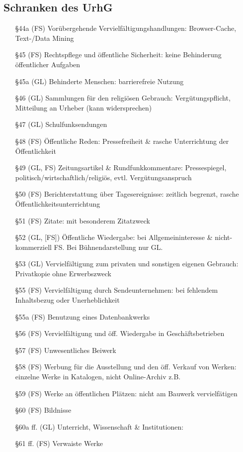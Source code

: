 \documentclass{article}
\begin{document}
\subsection{Schranken des UrhG}
\begin{itemize}
  \item[§44a] (FS) Vorübergehende Vervielfältigungshandlungen: Browser-Cache, Text-/Data Mining
  \item[§45] (FS) Rechtspflege und öffentliche Sicherheit: keine Behinderung öffentlicher Aufgaben
  \item[§45a] (GL) Behinderte Menschen: barrierefreie Nutzung
  \item[§46] (GL)  Sammlungen für den religiösen Gebrauch: Vergütungspflicht, Mitteilung an Urheber (kann widersprechen)
  \item[§47] (GL)  Schulfunksendungen
  \item[§48] (FS)  Öffentliche Reden: Pressefreiheit \& rasche Unterrichtung der Öffentlichkeit
  \item[§49] (GL, FS) Zeitungsartikel \& Rundfunkkommentare: Pressespiegel, politisch/wirtschaftlich/religiös, evtl. Vergütungsanspruch
  \item[§50] (FS) Berichterstattung über Tagesereignisse: zeitlich begrenzt, rasche Öffentlichkeitsunterrichtung
  \item[§51] (FS) Zitate: mit besonderem Zitatzweck
  \item[§52] (GL, [FS]) Öffentliche Wiedergabe: bei Allgemeininteresse \& nicht-kommerziell FS. Bei Bühnendarstellung nur GL.
  \item[§53] (GL) Vervielfältigung zum privaten und sonstigen eigenen Gebrauch: Privatkopie ohne Erwerbszweck
  \item[§55] (FS) Vervielfältigung durch Sendeunternehmen: bei fehlendem Inhaltsbezug oder Unerheblichkeit
  \item[§55a] (FS) Benutzung eines Datenbankwerks
  \item[§56] (FS) Vervielfältigung und öff. Wiedergabe in Geschäftsbetrieben
  \item[§57] (FS) Unwesentliches Beiwerk
  \item[§58] (FS) Werbung für die Ausstellung und den öff. Verkauf von Werken: einzelne Werke in Katalogen, nicht Online-Archiv z.B.
  \item[§59] (FS) Werke an öffentlichen Plätzen: nicht am Bauwerk vervielfätigen
  \item[§60] (FS) Bildnisse
  \item[§60a ff.] (GL) Unterricht, Wissenschaft \& Institutionen:
  \item[§61 ff.] (FS) Verwaiste Werke
\end{itemize}
\end{document}
